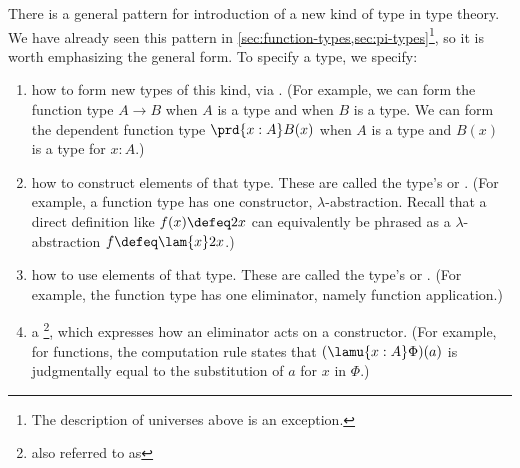 \begin{rmk}\label{rmk:introducing-new-concepts}
  There is a general pattern for introduction of a new kind of type in type theory.
  We have already seen this pattern in \cref{sec:function-types,sec:pi-types}\footnote{The description of universes above is an exception.}, so it is worth emphasizing the general form.
  To specify a type, we specify:
  \begin{enumerate}
  \item how to form new types of this kind, via .
(For example, we can form the function type $A \to B$ when $A$ is a type and when $B$ is a type. We can form the dependent function type $\prd{x:A} B(x)$ when $A$ is a type and $B(x)$ is a type for $x:A$.)

  \item how to construct elements of that type.  
    These are called the type's  or .
    (For example, a function type has one constructor, $\lambda$-abstraction.
    Recall that a direct definition like $f(x)\defeq 2x$ can equivalently be phrased
    as a $\lambda$-abstraction $f\defeq \lam{x} 2x$.)

  \item how to use elements of that type.  
    These are called the type's  or .
    (For example, the function type has one eliminator, namely function application.)

  \item 
    a \footnote{also referred to as }, which expresses how an eliminator acts on a constructor.
(For example, for functions, the computation rule states that $(\lamu{x:A}\Phi)(a)$ is judgmentally equal to the substitution of $a$ for $x$ in $\Phi$.)


\end{enumerate}
\end{rmk}
